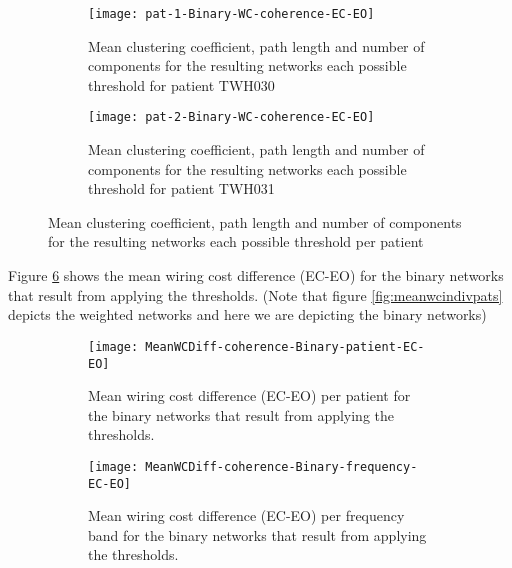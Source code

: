 \documentclass[11pt, onecolumn]{article}
\begin{document}
\begin{figure}[ht] 
  \begin{subfigure}[t]{0.5\linewidth}
    \centering
    \texttt{[image: pat-1-Binary-WC-coherence-EC-EO]} 
    \caption{Mean clustering coefficient, path length and number of components for the resulting networks each possible threshold for patient TWH030} 
    \label{fig0:a} 
    \vspace{4ex}
  \end{subfigure}%
  \hspace{1ex}
  \begin{subfigure}[t]{0.5\linewidth}
    \centering
    \texttt{[image: pat-2-Binary-WC-coherence-EC-EO]} 
    \caption{Mean clustering coefficient, path length and number of components for the resulting networks each possible threshold for patient TWH031}
    \label{fig0:b} 
    \vspace{4ex}
  \end{subfigure} 
  \caption{Mean clustering coefficient, path length and number of components for the resulting networks each possible threshold per patient}
  \label{fig:binarymeanwcindivpats} 
\end{figure}

Figure \ref{fig:binarymeanwcindivpatsmeans} shows the mean wiring cost difference (EC-EO) for the binary networks that result from applying the thresholds. (Note that figure \ref{fig:meanwcindivpats} depicts the weighted networks and here we are depicting the binary networks)

\begin{figure}[ht] 
  \begin{subfigure}[t]{0.5\linewidth}
    \centering
    \texttt{[image: MeanWCDiff-coherence-Binary-patient-EC-EO]} 
    \caption{Mean wiring cost difference (EC-EO) per patient for the binary networks that result from applying the thresholds.} 
    \label{binarymeanwcindivpatsmeans:a} 
    \vspace{4ex}
  \end{subfigure}%
  \hspace{1ex}
  \begin{subfigure}[t]{0.5\linewidth}
    \centering
    \texttt{[image: MeanWCDiff-coherence-Binary-frequency-EC-EO]} 
    \caption{Mean wiring cost difference (EC-EO) per frequency band for the binary networks that result from applying the thresholds.}
    \label{binarymeanwcindivpatsmeans:b} 
    \vspace{4ex}
  \end{subfigure} 
  \caption{}
  \label{fig:binarymeanwcindivpatsmeans} 
\end{figure}
\end{document}
